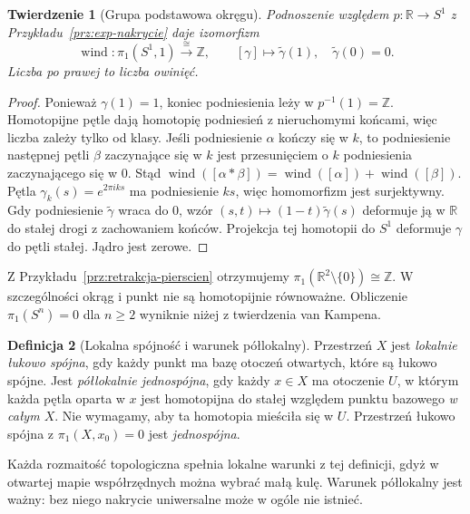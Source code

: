\documentclass[11pt,a4paper,oneside]{report}
\newcommand{\R}{\mathbb{R}}
\newcommand{\Z}{\mathbb{Z}}
\theoremstyle{plain}
\newtheorem{twierdzenie}{Twierdzenie}[section]
\theoremstyle{definition}
\newtheorem{definicja}[twierdzenie]{Definicja}
\theoremstyle{remark}
\begin{document}
\begin{twierdzenie}[Grupa podstawowa okręgu]
\label{thm:pi1-okragu}
Podnoszenie względem $p:\R\to S^1$
z Przykładu~\ref{prz:exp-nakrycie} daje
izomorfizm
\[
 \operatorname{wind}:\pi_1(S^1,1)\xrightarrow{\ \cong\ }\Z,
 \qquad [\gamma]\longmapsto
 \widetilde\gamma(1),
 \quad \widetilde\gamma(0)=0.
\]
Liczba po prawej to \emph{liczba owinięć}.
\end{twierdzenie}
\begin{proof}
Ponieważ $\gamma(1)=1$, koniec
podniesienia leży w $p^{-1}(1)=\Z$.
Homotopijne pętle dają homotopię
podniesień z nieruchomymi końcami,
więc liczba zależy tylko od klasy.
Jeśli podniesienie $\alpha$ kończy się w $k$,
to podniesienie następnej pętli $\beta$
zaczynające się w $k$ jest przesunięciem
o $k$ podniesienia zaczynającego się w $0$.
Stąd $\operatorname{wind}([\alpha*\beta])
=\operatorname{wind}([\alpha])
+\operatorname{wind}([\beta])$.
Pętla $\gamma_k(s)=e^{2\pi i ks}$
ma podniesienie $ks$, więc homomorfizm
jest surjektywny. Gdy podniesienie
$\widetilde\gamma$ wraca do $0$,
wzór $(s,t)\mapsto(1-t)\widetilde\gamma(s)$
deformuje ją w $\R$ do stałej drogi
z zachowaniem końców. Projekcja tej
homotopii do $S^1$ deformuje $\gamma$
do pętli stałej. Jądro jest zerowe.
\end{proof}

Z Przykładu~\ref{prz:retrakcja-pierscien}
otrzymujemy $\pi_1(\R^2\setminus\{0\})\cong\Z$.
W szczególności okrąg i punkt nie są
homotopijnie równoważne. Obliczenie
$\pi_1(S^{n})=0$ dla $n\geq2$
wyniknie niżej z twierdzenia van Kampena.

\begin{definicja}[Lokalna spójność i warunek półlokalny]
\label{def:semilokalnie-prosto-spojna}
Przestrzeń $X$ jest \emph{lokalnie łukowo spójna},
gdy każdy punkt ma bazę otoczeń otwartych,
które są łukowo spójne. Jest
\emph{półlokalnie jednospójna}, gdy każdy
$x\in X$ ma otoczenie $U$, w którym
każda pętla oparta w $x$ jest homotopijna do stałej
względem punktu bazowego \emph{w całym $X$}. Nie wymagamy, aby
ta homotopia mieściła się w $U$.
Przestrzeń łukowo spójna z
$\pi_1(X,x_0)=0$ jest \emph{jednospójna}.
\end{definicja}

Każda rozmaitość topologiczna spełnia
lokalne warunki z tej definicji, gdyż
w otwartej mapie współrzędnych można
wybrać małą kulę. Warunek półlokalny
jest ważny: bez niego nakrycie uniwersalne
może w ogóle nie istnieć.
\end{document}

